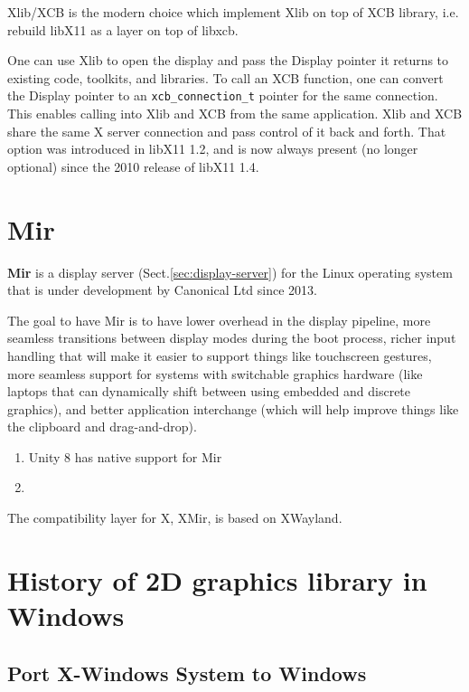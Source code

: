 Xlib/XCB is the modern choice which implement Xlib on top of XCB library, i.e.
rebuild libX11 as a layer on top of libxcb. 

One can use Xlib to open the display and pass the Display pointer it returns to
existing code, toolkits, and libraries. To call an XCB function, one can convert
the Display pointer to an \verb!xcb_connection_t! pointer for the same
connection.
This enables calling into Xlib and XCB from the same application.
Xlib and XCB share the same X server connection and pass control of it back and
forth. That option was introduced in libX11 1.2, and is now always present (no
longer optional) since the 2010 release of libX11 1.4.




\section{Mir}
\label{sec:Mir}

{\bf Mir} is a  display server (Sect.\ref{sec:display-server}) for the Linux
operating system that is under development by Canonical Ltd since 2013.

The goal to have Mir is to have lower overhead in the display pipeline, more
seamless transitions between display modes during the boot process, richer input
handling that will make it easier to support things like touchscreen gestures,
more seamless support for systems with switchable graphics hardware (like
laptops that can dynamically shift between using embedded and discrete
graphics), and better application interchange (which will help improve things
like the clipboard and drag-and-drop).

\begin{enumerate}
  \item Unity 8 has native support for Mir
  
  \item 
\end{enumerate}
The compatibility layer for X, XMir, is based on XWayland.



\section{History of 2D graphics library in Windows}
\label{sec:2D-graphics-Windows}

\subsection{Port X-Windows System to Windows}

